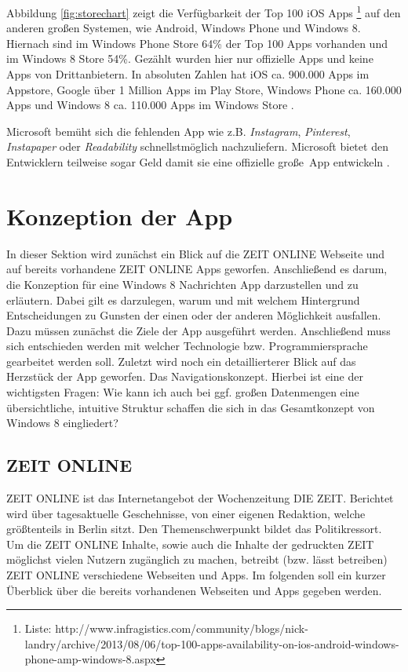 \documentclass[12pt,a4paper,bibtotoc,abstracton]{scrartcl}
\begin{document}
Abbildung \ref{fig:storechart} zeigt die Verfügbarkeit der Top 100 iOS Apps \footnote{Liste: http://www.infragistics.com/community/blogs/nick-landry/archive/2013/08/06/top-100-apps-availability-on-ios-android-windows-phone-amp-windows-8.aspx} auf den anderen großen Systemen, wie Android, Windows Phone und Windows 8. Hiernach sind im Windows Phone Store 64\% der Top 100 Apps vorhanden und im Windows 8 Store 54\%. Gezählt wurden hier nur offizielle Apps und keine Apps von Drittanbietern. In absoluten Zahlen hat iOS ca. 900.000 Apps im Appstore, Google über 1 Million Apps im Play Store, Windows Phone ca. 160.000 Apps und Windows 8 ca. 110.000 Apps im Windows Store \citep{WinbetaStore2013}.

Microsoft bemüht sich die fehlenden App wie z.B. \textit{Instagram}, \textit{Pinterest}, \textit{Instapaper} oder \textit{Readability} schnellstmöglich nachzuliefern. Microsoft bietet den Entwicklern teilweise sogar Geld damit sie eine offizielle \glqq große\grqq\ App entwickeln \citep{WinbetaStore2013}.


\newpage
\section{Konzeption der App}
\label{sec:konzeption}
In dieser Sektion wird zunächst ein Blick auf die ZEIT ONLINE Webseite und auf bereits vorhandene ZEIT ONLINE Apps geworfen. Anschließend es darum, die Konzeption für eine Windows 8 Nachrichten App darzustellen und zu erläutern. Dabei gilt es darzulegen, warum und mit welchem Hintergrund Entscheidungen zu Gunsten der einen oder der anderen Möglichkeit ausfallen. Dazu müssen zunächst die Ziele der App ausgeführt werden. Anschließend muss sich entschieden werden mit welcher Technologie bzw. Programmiersprache gearbeitet werden soll. Zuletzt wird noch ein detaillierterer Blick auf das Herzstück der App geworfen. Das Navigationskonzept. Hierbei ist eine der wichtigsten Fragen: \glqq Wie kann ich auch bei ggf. großen Datenmengen eine übersichtliche, intuitive Struktur schaffen die sich in das Gesamtkonzept von Windows 8 eingliedert?\grqq  

\subsection{ZEIT ONLINE}
\label{subsec:zeitonline}
ZEIT ONLINE ist das Internetangebot der Wochenzeitung DIE ZEIT. Berichtet wird über tagesaktuelle Geschehnisse, von einer eigenen Redaktion, welche größtenteils in Berlin sitzt. Den Themenschwerpunkt bildet das Politikressort. Um die ZEIT ONLINE Inhalte, sowie auch die Inhalte der gedruckten ZEIT möglichst vielen Nutzern zugänglich zu machen, betreibt (bzw. lässt betreiben) ZEIT ONLINE verschiedene Webseiten und Apps. Im folgenden soll ein kurzer Überblick über die bereits vorhandenen Webseiten und Apps gegeben werden.
\end{document}
